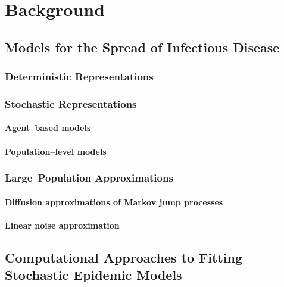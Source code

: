 \chapter{Background}
\label{chap:background}

\section{Models for the Spread of Infectious Disease}
\label{sec:outbreak_models}

\subsection{Deterministic Representations}
\label{subsec:deterministic_models}

\subsection{Stochastic Representations}
\label{subsec:stochastic_models}

\subsubsection{Agent--based models}
\label{subsubsec:agent_based_models}

\subsubsection{Population--level models}
\label{subsubsec:pop_level_models}

\subsection{Large--Population Approximations}
\label{subsec:large_pop_approx}

\subsubsection{Diffusion approximations of Markov jump processes}
\label{subsubsec:diff_approx}

\subsubsection{Linear noise approximation}
\label{subsubsec:lna_background}

\section{Computational Approaches to Fitting Stochastic Epidemic Models}
\label{sec:computational_background}

